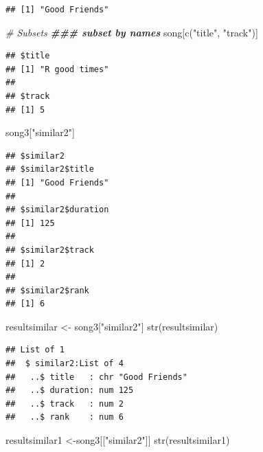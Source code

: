 \documentclass[
]{book}
\newenvironment{Shaded}{\begin{snugshade}}{\end{snugshade}}
\newcommand{\CommentTok}[1]{\textcolor[rgb]{0.56,0.35,0.01}{\textit{#1}}}
\newcommand{\DocumentationTok}[1]{\textcolor[rgb]{0.56,0.35,0.01}{\textbf{\textit{#1}}}}
\newcommand{\FunctionTok}[1]{\textcolor[rgb]{0.00,0.00,0.00}{#1}}
\newcommand{\NormalTok}[1]{#1}
\newcommand{\OtherTok}[1]{\textcolor[rgb]{0.56,0.35,0.01}{#1}}
\newcommand{\StringTok}[1]{\textcolor[rgb]{0.31,0.60,0.02}{#1}}
\begin{document}
\begin{verbatim}
## [1] "Good Friends"
\end{verbatim}

\begin{Shaded}
\begin{Highlighting}[]
\CommentTok{\# Subsets}
\DocumentationTok{\#\#\# subset by names}
\NormalTok{song[}\FunctionTok{c}\NormalTok{(}\StringTok{"title"}\NormalTok{, }\StringTok{"track"}\NormalTok{)]}
\end{Highlighting}
\end{Shaded}

\begin{verbatim}
## $title
## [1] "R good times"
## 
## $track
## [1] 5
\end{verbatim}

\begin{Shaded}
\begin{Highlighting}[]
\NormalTok{song3[}\StringTok{"similar2"}\NormalTok{]}
\end{Highlighting}
\end{Shaded}

\begin{verbatim}
## $similar2
## $similar2$title
## [1] "Good Friends"
## 
## $similar2$duration
## [1] 125
## 
## $similar2$track
## [1] 2
## 
## $similar2$rank
## [1] 6
\end{verbatim}

\begin{Shaded}
\begin{Highlighting}[]
\NormalTok{resultsimilar }\OtherTok{\textless{}{-}}\NormalTok{ song3[}\StringTok{"similar2"}\NormalTok{]}
\FunctionTok{str}\NormalTok{(resultsimilar)}
\end{Highlighting}
\end{Shaded}

\begin{verbatim}
## List of 1
##  $ similar2:List of 4
##   ..$ title   : chr "Good Friends"
##   ..$ duration: num 125
##   ..$ track   : num 2
##   ..$ rank    : num 6
\end{verbatim}

\begin{Shaded}
\begin{Highlighting}[]
\NormalTok{resultsimilar1 }\OtherTok{\textless{}{-}}\NormalTok{song3[[}\StringTok{"similar2"}\NormalTok{]]}
\FunctionTok{str}\NormalTok{(resultsimilar1)}
\end{Highlighting}
\end{Shaded}
\end{document}
